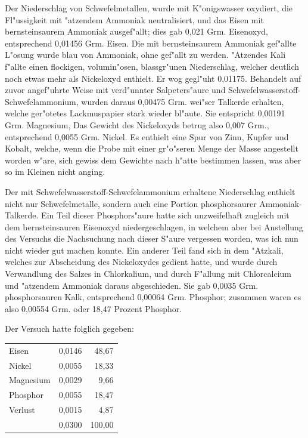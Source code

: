 \documentclass[a4paper, 11pt, oneside]{article}
\begin{document}
Der Niederschlag von Schwefelmetallen, wurde mit K"onigswasser oxydiert, die Fl"ussigkeit mit "atzendem Ammoniak neutralisiert, und das Eisen mit bernsteinsaurem Ammoniak ausgef"allt; dies gab 0,021 Grm. Eisenoxyd, entsprechend 0,01456 Grm. Eisen. Die mit bernsteinsaurem Ammoniak gef"allte L"osung wurde blau von Ammoniak, ohne gef"allt zu werden. "Atzendes Kali f"allte einen flockigen, volumin"osen, blassgr"unen Niederschlag, welcher deutlich noch etwas mehr als Nickeloxyd enthielt. Er wog gegl"uht 0,01175. Behandelt auf zuvor angef"uhrte Weise mit verd"unnter Salpeters"aure und Schwefelwasserstoff-Schwefelammonium, wurden daraus 0,00475 Grm. wei"ser Talkerde erhalten, welche ger"otetes Lackmuspapier stark wieder bl"aute. Sie entspricht 0,00191 Grm. Magnesium, Das Gewicht des Nickeloxyds betrug also 0,007 Grm., entsprechend 0,0055 Grm. Nickel. Es enthielt eine Spur von Zinn, Kupfer und Kobalt, welche, wenn die Probe mit einer gr"o"seren Menge der Masse angestellt worden w"are, sich gewiss dem Gewichte nach h"atte bestimmen lassen, was aber so im Kleinen nicht anging.

Der mit Schwefelwasserstoff-Schwefelammonium erhaltene Niederschlag enthielt nicht nur Schwefelmetalle, sondern auch eine Portion phosphorsaurer Ammoniak-Talkerde. Ein Teil dieser Phosphors"aure hatte sich unzweifelhaft zugleich mit dem bernsteinsauren Eisenoxyd niedergeschlagen, in welchem aber bei Anstellung des Versuchs die Nachsuchung nach dieser S"aure vergessen worden, was ich nun nicht wieder gut machen konnte. Ein anderer Teil fand sich in dem "Atzkali, welches zur Abscheidung des Nickeloxydes gedient hatte, und wurde durch Verwandlung des Salzes in Chlorkalium, und durch F"allung mit Chlorcalcium und "atzendem Ammoniak daraus abgeschieden. Sie gab 0,0035 Grm. phosphorsauren Kalk, entsprechend 0,00064 Grm. Phosphor; zusammen waren es also 0,00554 Grm. oder 18,47 Prozent Phosphor.

Der Versuch hatte folglich gegeben:
\begin{center}
\begin{tabular}{ l r r }
    Eisen & 0,0146 & 48,67\\
    Nickel & 0,0055 & 18,33\\
    Magnesium & 0,0029 & 9,66\\
    Phosphor & 0,0055 & 18,47\\
    Verlust & 0,0015 & 4,87\\\hline
    & 0,0300 & 100,00\\
\end{tabular}
\end{center}
\end{document}
